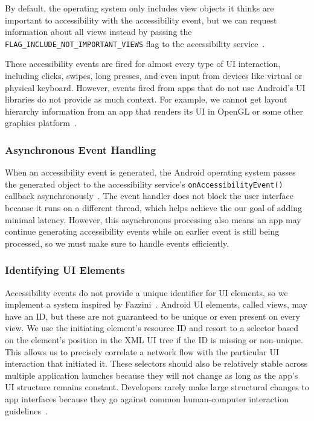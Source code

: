 By default, the operating system only includes view objects it thinks are
important to accessibility with the accessibility event, but we can request
information about all views instead by passing the 
\texttt{FLAG\_INCLUDE\_NOT\_IMPORTANT\_VIEWS} flag to the accessibility
service~\cite{accessibilityserviceguide}.

These accessibility events are fired for almost every type of UI interaction,
including clicks, swipes, long presses, and even input from devices like virtual
or physical keyboard. However, events fired from apps that do not use Android's
UI libraries do not provide as much context. For example, we cannot get layout
hierarchy information from an app that renders its UI in OpenGL or some other
graphics platform~\cite{accessibilityserviceguide}.


\subsubsection{Asynchronous Event Handling}
\label{sec:asynchronous-event-handling}

When an accessibility event is generated, the Android operating system passes
the generated object to the accessibility service's
\texttt{onAccessibilityEvent()} callback
asynchronously~\cite{googledevelopers2020}. The event handler does not block the
user interface because it runs on a different thread, which helps achieve the
our goal of adding minimal latency. However, this asynchronous processing also
means an app may continue generating accessibility events while an earlier event
is still being processed, so we must make sure to handle events efficiently.

\subsubsection{Identifying UI Elements}
\label{sec:identifying-ui-elements}

Accessibility events do not provide a unique identifier for UI elements, so we
implement a system inspired by Fazzini~\etal \cite{fazzini2017}. Android UI
elements, called views, may have an ID, but these are not guaranteed to be
unique or even present on every view. We use the initiating element's resource
ID and resort to a selector based on the element's position in the XML UI tree
if the ID is missing or non-unique. This allows us to precisely correlate a
network flow with the particular UI interaction that initiated it. These
selectors should also be relatively stable across multiple application launches
because they will not change as long as the app's UI structure remains constant.
Developers rarely make large structural changes to app interfaces because they
go against common human-computer interaction guidelines~\cite{norman2013}.


